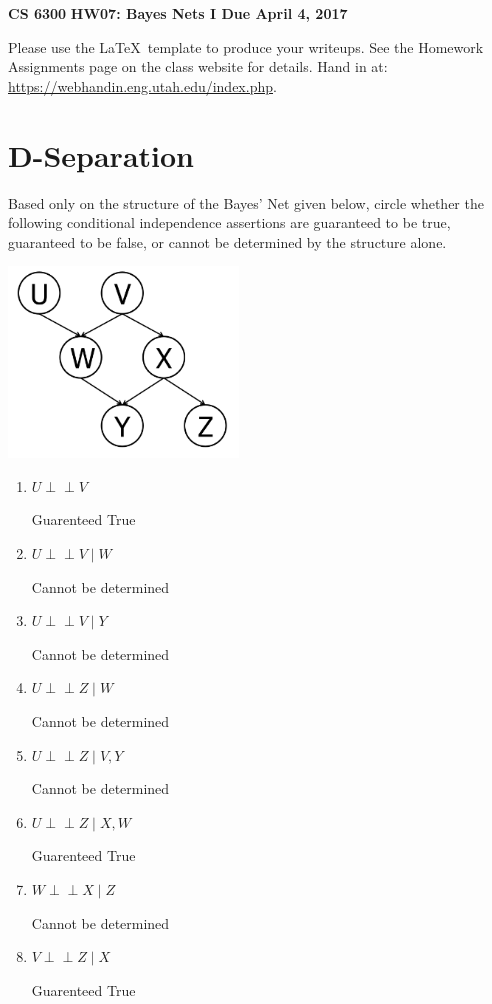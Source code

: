 \documentclass[12pt]{article}
\newcommand{\indep}{\perp\!\!\!\perp}
\begin{document}
\begin{center}
{\bf CS 6300} \hfill {\large\bf HW07: Bayes Nets I \hfill Due April 4, 2017}
\end{center}

\noindent
Please use the \LaTeX\ template to produce your writeups. See the
Homework Assignments page on the class website for details.  Hand in
at: \url{https://webhandin.eng.utah.edu/index.php}.

\section{D-Separation}
 
Based only on the structure of the Bayes' Net given below,
circle whether the following conditional independence assertions are
guaranteed to be true, guaranteed to be false, or cannot be determined
by the structure alone.

\begin{center}
\includegraphics[height=2in]{prob1.png}
\end{center}

\begin{enumerate}

\item $U \indep V$

Guarenteed True

\item $U \indep V \mid W$

Cannot be determined

\item $U \indep V \mid Y$

Cannot be determined

\item $U \indep Z \mid W$

Cannot be determined

\item $U \indep Z \mid V, Y$

Cannot be determined

\item $U \indep Z \mid X, W$

Guarenteed True

\item $W \indep X \mid Z$

Cannot be determined

\item $V \indep Z \mid X$

Guarenteed True

\end{enumerate}
\end{document}
